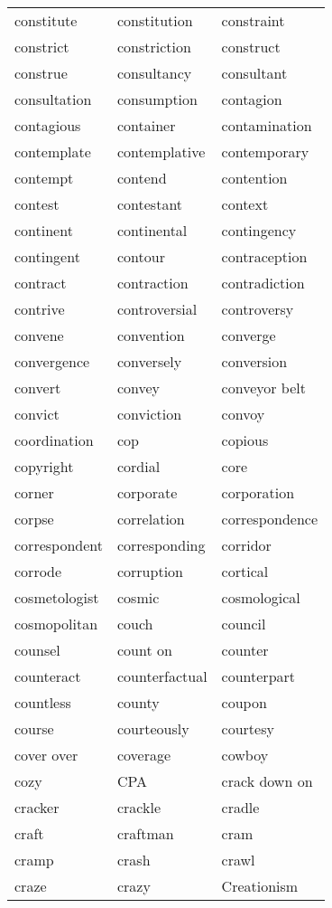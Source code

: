 \documentclass{minimal}
\begin{document}
\begin{longtable}{p{2.8cm}p{2.8cm}p{2.8cm}}
constitute & constitution & constraint \\
constrict & constriction & construct \\
construe & consultancy & consultant \\
consultation & consumption & contagion \\
contagious & container & contamination \\
contemplate & contemplative & contemporary \\
contempt & contend & contention \\
contest & contestant & context \\
continent & continental & contingency \\
contingent & contour & contraception \\
contract & contraction & contradiction \\
contrive & controversial & controversy \\
convene & convention & converge \\
convergence & conversely & conversion \\
convert & convey & conveyor belt \\
convict & conviction & convoy \\
coordination & cop & copious \\
copyright & cordial & core \\
corner & corporate & corporation \\
corpse & correlation & correspondence \\
correspondent & corresponding & corridor \\
corrode & corruption & cortical \\
cosmetologist & cosmic & cosmological \\
cosmopolitan & couch & council \\
counsel & count on & counter \\
counteract & counterfactual & counterpart \\
countless & county & coupon \\
course & courteously & courtesy \\
cover over & coverage & cowboy \\
cozy & CPA & crack down on \\
cracker & crackle & cradle \\
craft & craftman & cram \\
cramp & crash & crawl \\
craze & crazy & Creationism \\

\end{longtable}
\end{document}

